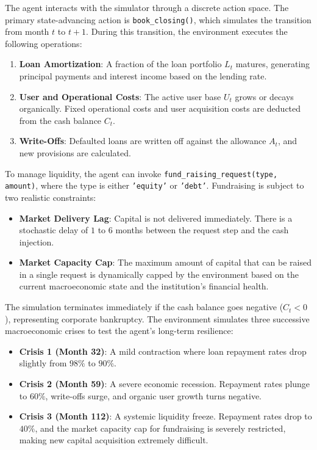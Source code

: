 The agent interacts with the simulator through a discrete action space. The primary state-advancing action is \texttt{book\_closing()}, which simulates the transition from month $t$ to $t+1$. During this transition, the environment executes the following operations:
\begin{enumerate}[leftmargin=*]
    \item \textbf{Loan Amortization}: A fraction of the loan portfolio $L_t$ matures, generating principal payments and interest income based on the lending rate.
    \item \textbf{User and Operational Costs}: The active user base $U_t$ grows or decays organically. Fixed operational costs and user acquisition costs are deducted from the cash balance $C_t$.
    \item \textbf{Write-Offs}: Defaulted loans are written off against the allowance $A_t$, and new provisions are calculated.
\end{enumerate}

To manage liquidity, the agent can invoke \texttt{fund\_raising\_request(type, amount)}, where the type is either \texttt{'equity'} or \texttt{'debt'}. Fundraising is subject to two realistic constraints:
\begin{itemize}[leftmargin=*]
    \item \textbf{Market Delivery Lag}: Capital is not delivered immediately. There is a stochastic delay of $1$ to $6$ months between the request step and the cash injection.
    \item \textbf{Market Capacity Cap}: The maximum amount of capital that can be raised in a single request is dynamically capped by the environment based on the current macroeconomic state and the institution's financial health.
\end{itemize}

The simulation terminates immediately if the cash balance goes negative ($C_t < 0$), representing corporate bankruptcy. The environment simulates three successive macroeconomic crises to test the agent's long-term resilience:
\begin{itemize}[leftmargin=*]
    \item \textbf{Crisis 1 (Month 32)}: A mild contraction where loan repayment rates drop slightly from $98\%$ to $90\%$.
    \item \textbf{Crisis 2 (Month 59)}: A severe economic recession. Repayment rates plunge to $60\%$, write-offs surge, and organic user growth turns negative.
    \item \textbf{Crisis 3 (Month 112)}: A systemic liquidity freeze. Repayment rates drop to $40\%$, and the market capacity cap for fundraising is severely restricted, making new capital acquisition extremely difficult.
\end{itemize}

